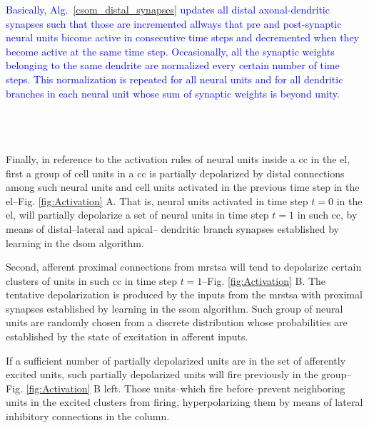 \documentclass[10pt,letterpaper]{article}
\begin{document}
\textcolor{blue}{Basically, Alg.~\ref{csom_distal_synapses} updates all distal axonal-dendritic synapses such that those are incremented allways that pre and post-synaptic neural units bicome active in consecutive time steps and decremented when they become active at the same time step. Occasionally, all the synaptic weights belonging to the same dendrite are normalized every certain number of time steps. This normalization is repeated for all neural units and for all dendritic branches in each neural unit whose sum of synaptic weights is beyond unity}.







~\\
~\\
~\\

Finally, in reference to the activation rules of neural units inside a \gls{cc} in the \gls{el},
first a group of cell units in a \gls{cc} is partially depolarized 
by distal connections among such neural units and cell units activated in the
previous time step in the \gls{el}--Fig. \ref{fig:Activation} A.
That is, neural units activated in time step $t=0$ in the \gls{el}, will partially depolarize
a set of neural units in time step $t=1$ in such \gls{cc}, by means of distal--lateral and apical--
dendritic branch synapses established by learning in the \gls{dsom} algorithm.

Second, afferent proximal connections from \gls{mrstsa} will tend to depolarize
certain clusters of units in such \gls{cc} in time step $t=1$--Fig. \ref{fig:Activation} B.
The tentative depolarization is produced by the inputs from the \gls{mrstsa} with
proximal synapses established by learning in the \gls{ssom} algorithm. 
Such group of neural units are randomly chosen from a discrete distribution
whose probabilities are established by the state of excitation in afferent inputs.

If a sufficient number of partially depolarized units are in the set of
afferently excited units, such partially depolarized units
will fire previously in the group--Fig. \ref{fig:Activation} B left.
Those units--which fire before--prevent neighboring units in the excited clusters from firing,
hyperpolarizing them by means of lateral inhibitory connections in the column.
\end{document}
